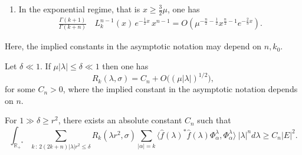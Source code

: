 \documentclass[10pt,a4paper]{amsart}
\newcommand{\R}{\ensuremath{\mathbb{R_+}}}
\begin{document}
\begin{lemma}
\begin{enumerate}
\begin{enumerate}
 \item [\emph{(\emph{c})}] \hspace*{.7mm} If $ \mu + c \, \mu^{1/3} \leq x \, \leq {\textstyle \frac{3}{2}} \mu$, then
    \begin{equation}\label{Airy merging with exponential}
        \begin{split}
            \frac{\Gamma(k+1)}{\Gamma(k+n)} \,   & L^{n-1}_{k}(x) \, e^{- \frac{1}{2} x} \,  x^{n-1} \\
            & = \, (-1)^{k} \mu^{{-\textstyle\frac{4}{3}} } \,   \mu^{ {\textstyle\frac{1}{12} } }  (x- \mu)^{ - {\textstyle\frac{1}{4}  } } \, e^{ - {\frac{2}{3}  } \mu^{- \frac{1}{2}} (x- \mu)^{3/2}    } \left[   1 + O \left(   \mu^{-\frac{1}{4}} (x - \mu )^{- \frac{3}{4}}  \right)    \right].
        \end{split}
    \end{equation}  
    \end{enumerate}
    \item[\emph{(3)}] In the exponential regime, that is $x \geq \frac{3}{2} \mu$, one has
     \begin{equation}\label{expo regime}
        \begin{split}
            \frac{\Gamma(k+1)}{\Gamma(k+n)} \,   & L^{n-1}_{k}(x) \, e^{- \frac{1}{2} x} \,  x^{n-1} = O \left( \mu^{ -\frac{n}{2}-\frac{1}{2}} x^{\frac{n}{2}-1} e^{- \frac{2}{3} x}  \right).
        \end{split}
    \end{equation} 
\end{enumerate}
Here, the implied constants in the asymptotic notation may depend on $n, k_{0}$. 
\end{lemma}

\begin{lemma}\label{Surface coeff. low}
    Let $\delta \ll 1$. If $\mu |\lambda| \leq \delta \ll 1$ then one has 
    \begin{equation}\label{Low frequency surface coeff}
        R_{k}(\lambda, \sigma) =  C_{n} + O \big( (\mu |\lambda|)^{1/2} \big),
    \end{equation}
    for some $C_{n}>0$, where the implied constant in the asymptotic notation  depends on $n$.
\end{lemma}

\begin{lemma}\label{the LFE} For $1 \gg \delta \geq r^{2}$, there exists an absolute constant $C_{n}$ such that
\begin{equation}\label{low frequency contri}
    \int_{\R^{*}} \sum_{k \, : \, 2(2k +n) |\lambda | r^2 \leq \delta } R_{k}(\lambda r^{2},\sigma) \sum_{|\alpha|=k} \langle \hat{f}(\lambda)^{*} \hat{f}(\lambda) \Phi_{\alpha}^{\lambda},\Phi_{\alpha}^{\lambda} \rangle \ |\lambda|^n d\lambda \geq C_{n} |E|^2.
\end{equation}
\end{lemma}
\end{document}

